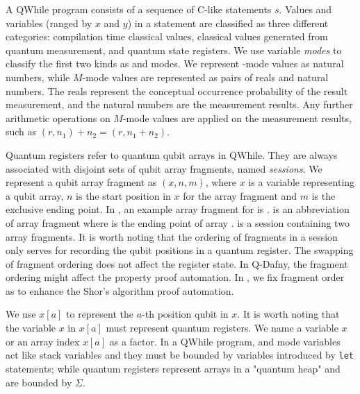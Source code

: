 A QWhile program consists of a sequence of C-like statements $s$.
Values and variables (ranged by $x$ and $y$) in a statement
are classified as three different categories: compilation time classical values, 
classical values generated from quantum measurement, and quantum state registers.
We use variable \textit{modes} to classify the first two kinds as \cmode and \qmode modes.
We represent \cmode-mode values as natural numbers, while $M$-mode values are represented as pairs of reals and natural numbers.
The reals represent the conceptual occurrence probability of the result measurement,
and the natural numbers are the measurement results.
Any further arithmetic operations on $M$-mode values are applied on the measurement results,
such as $(r,n_1)+n_2=(r,n_1+n_2)$.

Quantum registers refer to quantum qubit arrays in QWhile.
They are always associated with disjoint sets of qubit array fragments, named \textit{sessions}.
We represent a qubit array fragment as $(x,n,m)$, where $x$ is a variable representing a qubit array, $n$ is the start position in $x$ for the array fragment and $m$ is the exclusive ending point.
In , an example array fragment for  is .
 is an abbreviation of array fragment  where  is the ending point of array .
 is a session containing two array fragments.
It is worth noting that the ordering of fragments in a session only 
serves for recording the qubit positions in a quantum register.
The swapping of fragment ordering does not affect the register state.
In Q-Dafny, the fragment ordering might affect the property proof automation.
In , we fix fragment order as 
to enhance the Shor's algorithm proof automation. 

We use $x[a]$ to represent the $a$-th position qubit in $x$.
It is worth noting that the variable $x$ in $x[a]$ must represent quantum registers. 
We name a variable $x$ or an array index $x[a]$ as a factor.
In a QWhile program, \cmode and \qmode mode variables act like stack variables
and they must be bounded by variables introduced by \texttt{let} statements;
while quantum registers represent arrays in a "quantum heap" and are bounded by $\Sigma$.

